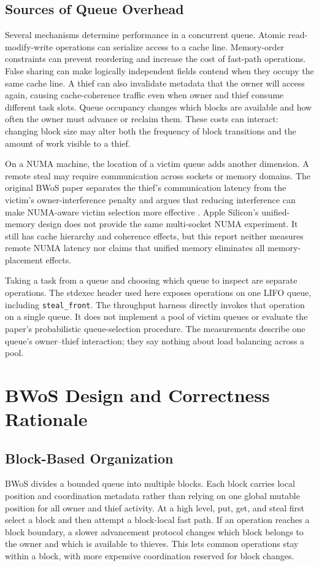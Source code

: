 \documentclass[conference]{IEEEtran}
\begin{document}
\subsection{Sources of Queue Overhead}
Several mechanisms determine performance in a concurrent queue. Atomic read-modify-write operations can serialize access to a cache line. Memory-order constraints can prevent reordering and increase the cost of fast-path operations. False sharing can make logically independent fields contend when they occupy the same cache line. A thief can also invalidate metadata that the owner will access again, causing cache-coherence traffic even when owner and thief consume different task slots. Queue occupancy changes which blocks are available and how often the owner must advance or reclaim them. These costs can interact: changing block size may alter both the frequency of block transitions and the amount of work visible to a thief.

On a NUMA machine, the location of a victim queue adds another dimension. A remote steal may require communication across sockets or memory domains. The original BWoS paper separates the thief's communication latency from the victim's owner-interference penalty and argues that reducing interference can make NUMA-aware victim selection more effective \cite{wang2023bwos}. Apple Silicon's unified-memory design does not provide the same multi-socket NUMA experiment. It still has cache hierarchy and coherence effects, but this report neither measures remote NUMA latency nor claims that unified memory eliminates all memory-placement effects.

Taking a task from a queue and choosing which queue to inspect are separate operations. The stdexec header used here exposes operations on one LIFO queue, including \texttt{steal\_front}. The throughput harness directly invokes that operation on a single queue. It does not implement a pool of victim queues or evaluate the paper's probabilistic queue-selection procedure. The measurements describe one queue's owner--thief interaction; they say nothing about load balancing across a pool.

\section{BWoS Design and Correctness Rationale}
\subsection{Block-Based Organization}
BWoS divides a bounded queue into multiple blocks. Each block carries local position and coordination metadata rather than relying on one global mutable position for all owner and thief activity. At a high level, put, get, and steal first select a block and then attempt a block-local fast path. If an operation reaches a block boundary, a slower advancement protocol changes which block belongs to the owner and which is available to thieves. This lets common operations stay within a block, with more expensive coordination reserved for block changes.
\end{document}

